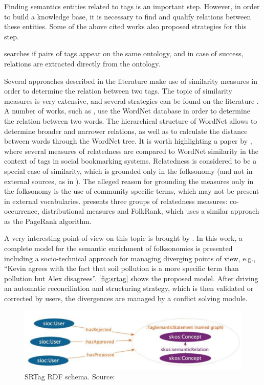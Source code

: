 Finding semantics entities related to tags is an important step.
However, in order to build a knowledge base, it is necessary to find and qualify relations between these entities.
Some of the above cited works also proposed strategies for this step.

 searches if pairs of tags appear on the same ontology, and in case of success, relations are extracted directly from the ontology.

Several approaches described in the literature make use of similarity measures in order to determine the relation between two tags.
The topic of similarity measures is very extensive, and several strategies can be found on the literature \cite{Harispe2015, Harispe2014, Trillo2007, Cilibrasi2007}.
A number of works, such as \cite{Limpens2013}, use the WordNet database in order to determine the relation between two words.
The hierarchical structure of WordNet allows to determine broader and narrower relations, as well as to calculate the distance between words through the WordNet tree.
It is worth highlighting a paper by , where several measures of relatedness are compared to WordNet similarity in the context of tags in social bookmarking systems.
Relatedness is considered to be a special case of similarity, which is grounded only in the folksonomy (and not in external sources, as in ).
The alleged reason for grounding the measures only in the folksonomy is the use of community specific terms, which may not be present in external vocabularies.
 presents three groups of relatedness measures: co-occurrence, distributional measures and FolkRank, which uses a similar approach as the PageRank algorithm.

A very interesting point-of-view on this topic is brought by .
In this work, a complete model for the semantic enrichment of folksonomies is presented including a socio-technical approach for managing diverging points of view, e.g., ``Kevin agrees with the fact that soil pollution is a more specific term than pollution but Alex disagrees''.
\autoref{fig:srtag} shows the proposed model.
After driving an automatic reconciliation and structuring strategy, which is then validated or corrected by users, the divergences are managed by a conflict solving module.

\begin{figure}[h]
\begin{center}
\includegraphics[width=\columnwidth]{images/SRTag.png}
\caption[SRTag RDF schema.]{SRTag RDF schema. Source: }
\label{fig:srtag}
\end{center}
\end{figure}

